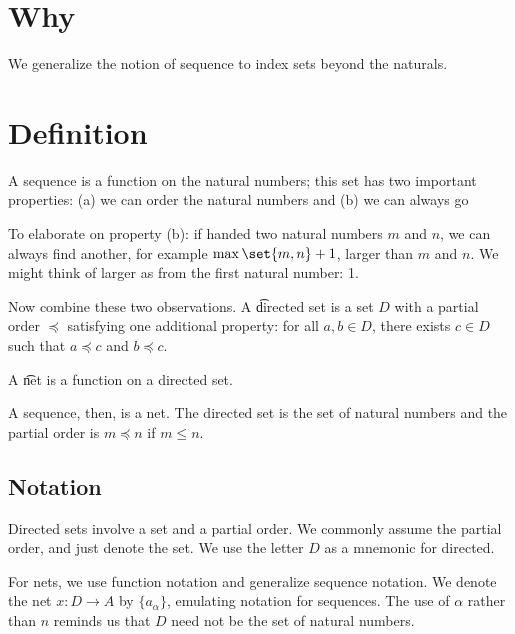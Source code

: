 

\section*{Why}

We generalize the notion of sequence to index sets beyond the naturals.
\section*{Definition}

A sequence is a function on the natural numbers; this set has two important properties: (a) we can order the natural numbers and (b) we can always go 

To elaborate on property (b):
if handed two natural numbers
$m$ and $n$,
we can always find another,
for example $\max\set{m,n}+1$,
larger than $m$ and $n$.
We might think of larger as
 from the
first natural number: 1.

Now combine these two observations.
A \t{directed set} is a set $D$ with a partial order $\preceq$ satisfying one additional property: for all $a, b \in D$, there exists $c \in D$ such that $a \preceq c$ and $b \preceq c$.

A \t{net} is a function on a directed set.

A sequence, then, is a net.
The directed set is the set of natural numbers and the partial order is $m \preceq n$ if $m \leq n$.

\subsection*{Notation}

Directed sets involve a set and a partial order.
We commonly assume the partial order, and just denote the set.
We use the letter $D$ as a mnemonic for directed.

For nets, we use function notation and generalize sequence notation.
We denote the net $x: D \to A$ by $\{a_{\alpha }\}$, emulating notation for sequences.
The use of $\alpha $ rather than $n$ reminds us that $D$ need not be the set of natural numbers.
